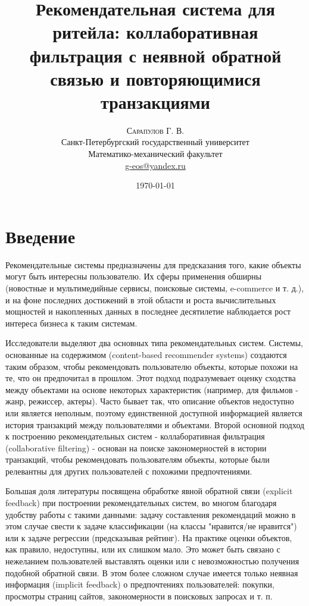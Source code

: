 \documentclass{article}
\title{Рекомендательная система для ритейла: коллаборативная фильтрация с неявной обратной связью и повторяющимися транзакциями} %
\author{%
\textsc{Сарапулов Г. В.} \\ %
\normalsize Санкт-Петербургский государственный университет \\ %
\normalsize Математико-механический факультет \\ %
\normalsize \href{mailto:g-eos@yandex.ru}{g-eos@yandex.ru} %
}
\date{\today} %
\begin{document}
\maketitle


\section{Введение}
Рекомендательные системы предназначены для предсказания того, какие объекты могут быть интересны пользователю. Их сферы применения обширны (новостные и мультимедийные сервисы, поисковые системы, e-commerce и т. д.), и на фоне последних достижений в этой области и роста вычислительных мощностей и накопленных данных в последнее десятилетие наблюдается рост интереса бизнеса к таким системам. \par
Исследователи выделяют два основных типа рекомендательных систем. Системы, основанные на содержимом (content-based recommender systems) создаются таким образом, чтобы рекомендовать пользователю объекты, которые похожи на те, что он предпочитал в прошлом. Этот подход подразумевает оценку сходства между объектами на основе некоторых характеристик (например, для фильмов - жанр, режиссер, актеры). Часто бывает так, что описание объектов недоступно или является неполным, поэтому единственной доступной информацией является история транзакций между пользователями и объектами. Второй основной подход к построению рекомендательных систем - коллаборативная фильтрация (collaborative filtering) -  основан на поиске закономерностей в истории транзакций, чтобы рекомендовать пользователям объекты, которые были релевантны для других пользователей с похожими предпочтениями. \par
Большая доля литературы посвящена обработке явной обратной связи (explicit feedback) при построении рекомендательных систем, во многом благодаря удобству работы с такими данными: задачу составления рекомендаций можно в этом случае свести к задаче классификации (на классы "нравится/не нравится") или к задаче регрессии (предсказывая рейтинг). На практике оценки объектов, как правило, недоступны, или их слишком мало. Это может быть связано с нежеланием пользователей выставлять оценки или с невозможностью получения подобной обратной связи. В этом более сложном случае имеется только неявная информация (implicit feedback) о предпочтениях пользователей: покупки, просмотры страниц сайтов, закономерности в поисковых запросах и т. п. \par
\end{document}

